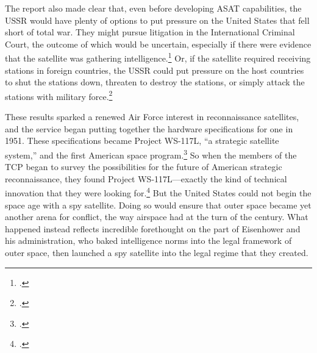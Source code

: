 \documentclass{report}
\begin{document}
The report also made clear that, even before developing ASAT capabilities, the USSR would have plenty of options to put pressure on the United States that fell short of total war. They might pursue litigation in the International Criminal Court, the outcome of which would be uncertain, especially if there were evidence that the satellite was gathering intelligence.\footcite[p.~16]{kecskemetic_satellite_1950} Or, if the satellite required receiving stations in foreign countries, the USSR could put pressure on the host countries to shut the stations down, threaten to destroy the stations, or simply attack the stations with military force.\footcite[p.~16-17. Importantly, these are all things that the Soviet Union could also have done with the U-2 spy plane. In fact, they might have even been more effective. Unlike the U-2 planes that took off from allied airfields, the first spy satellite, Project Corona, ejected a film capsule and required no such receiving stations. The US was somewhat more circumspect with its overflights, but the options were there.]{kecskemetic_satellite_1950}

These results sparked a renewed Air Force interest in reconnaissance satellites, and the service began putting together the hardware specifications for one in 1951. These specifications became Project WS-117L, ``a strategic satellite system,'' and the first American space program.\footcite[p.~110-111. The WS is short for ``Weapons System.'']{mcdougall_heavens_1985} So when the members of the TCP began to survey the possibilities for the future of American strategic reconnaissance, they found Project WS-117L---exactly the kind of technical innovation that they were looking for.\footcite[p.~197]{brugioni_eyes_2010} But the United States could not begin the space age with a spy satellite. Doing so would ensure that outer space became yet another arena for conflict, the way airspace had at the turn of the  century. What happened instead reflects incredible forethought on the part of Eisenhower and his administration, who baked intelligence norms into the legal framework of outer space, then launched a spy satellite into the legal regime that they created.
\end{document}
